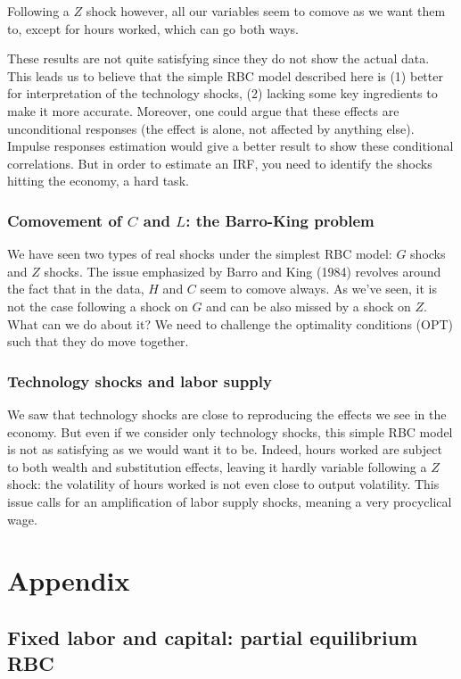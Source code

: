 \documentclass[12pt]{report}
\begin{document}
Following a $Z$ shock however, all our variables seem to comove as we want them to, except for hours worked, which can go both ways.

These results are not quite satisfying since they do not show the actual data. This leads us to believe that the simple RBC model described here is (1) better for interpretation of the technology shocks, (2) lacking some key ingredients to make it more accurate. Moreover, one could argue that these effects are unconditional responses (the effect is alone, not affected by anything else). Impulse responses estimation would give a better result to show these conditional correlations. But in order to estimate an IRF, you need to identify the shocks hitting the economy, a hard task.

\subsubsection{Comovement of $C$ and $L$: the Barro-King problem}

We have seen two types of real shocks under the simplest RBC model: $G$ shocks and $Z$ shocks. The issue emphasized by Barro and King (1984) revolves around the fact that in the data, $H$ and $C$ seem to comove always. As we've seen, it is not the case following a shock on $G$ and can be also missed by a shock on $Z$. What can we do about it? We need to challenge the optimality conditions (OPT) such that they do move together.

\subsubsection{Technology shocks and labor supply}

We saw that technology shocks are close to reproducing the effects we see in the economy. But even if we consider only technology shocks, this simple RBC model is not as satisfying as we would want it to be. Indeed, hours worked are subject to both wealth and substitution effects, leaving it hardly variable following a $Z$ shock: the volatility of hours worked is not even close to output volatility. This issue calls for an amplification of labor supply shocks, meaning a very procyclical wage.

\section{Appendix}

\subsection{Fixed labor and capital: partial equilibrium RBC}
\end{document}
